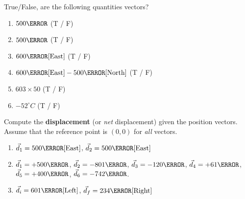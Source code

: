 \documentclass[12pt]{article} %
\newcommand{\tx}[1]{\text{#1}}
\begin{document}
    \renewcommand*{\coursecode}{Physics Homework} %
    \renewcommand*{\assgnnumber}{2} %
    \renewcommand*{\submdate}{August 16, 2021} %
    \renewcommand*{\studentfname}{Abdullah} %
    \renewcommand*{\studentlname}{Zubair} %

    \renewcommand\qedsymbol{$\blacksquare$}
    \setfigpath
    \pagestyle{crowdmark}
    \fancyhfoffset[L,O]{0pt} %
\begin{qstn}[1] %
True/False, are the following quantities vectors?
    \begin{enumerate}[label=(\alph*)]
        \item $500 \m$ (T / F)
        \item $500 \kg$ (T / F)
        \item $600 \tx{\m} [\tx{East}]$ (T / F)
        \item $600\tx{\m} [\tx{East}] - 500\tx{\m}[\tx{North}]$ (T / F)
        \item $603 \times 50$ (T / F)
        \item $-52^\circ C$ (T / F)
    \end{enumerate}


 \end{qstn}


 \begin{qstn}[2]
    Compute the \textbf{displacement} (or \emph{net} displacement) given the position vectors. Assume that the reference point is $(0,0)$ for \emph{all} vectors.
    \begin{enumerate}[label=(\alph*)]
        \item $\vec d_1 = 500 \tx{\m}[\tx{East}]$, $\vec d_2 = 500 \tx{\m}[\tx{East}]$
         \vspace*{4cm}
        \item $\vec d_1 = +500\km$, $\vec d_2 = -801\km$, $\vec d_3 = -120\km$, $\vec d_4 = +61\km$, $\vec d_5 = +400\km$, $\vec d_6 = -742\km$.
        \vspace*{12cm}
        \item $\vec d_i = 601\tx{\m}[\tx{Left}]$, $\vec d_f = 234\tx{\m}[\tx{Right}]$
    \end{enumerate}
\end{qstn}
\end{document}
